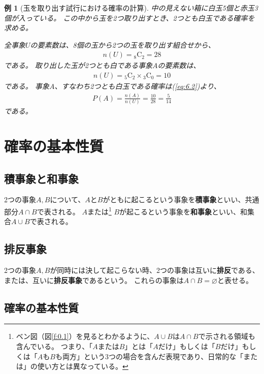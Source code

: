 \documentclass[luatexja,fontsize=12pt]{jlreq}\usepackage{ifthen}\newcounter{enlarge}\setcounter{enlarge}{1}
\newtheorem{eg}{例}
\begin{document}
\begin{eg}[玉を取り出す試行における確率の計算]
中の見えない箱に白玉5個と赤玉3個が入っている。
この中から玉を2つ取り出すとき、2つとも白玉である確率を求める。

全事象$U$の要素数は、8個の玉から2つの玉を取り出す組合せから、
\begin{align} \label{eq:6.5}
n(U) = {}_8 \mathrm{C}_2 = 28 
\end{align}
である。
取り出した玉が2つとも白である事象$A$の要素数は、
\begin{align} \label{eq:6.6}
n(U) = {}_5 \mathrm{C}_2 \times {}_3 \mathrm{C}_0 = 10 
\end{align}
である。
事象$A$、すなわち2つとも白玉である確率は(\ref{eq:6.2})より、
\begin{align} \label{eq:6.7}
P(A) = \frac{n(A)}{n(U)} = \frac{10}{28} = \frac{5}{14}
\end{align}
である。
\end{eg}

\section{確率の基本性質}

\subsection{積事象と和事象}

2つの事象$A, B$について、$A$と$B$がともに起こるという事象を\textbf{積事象}といい、共通部分$A \cap B$で表される。
$A$または\footnote{%
ベン図（図\ref{f:0.1}）を見るとわかるように、$A \cup B$は$A \cap B$で示される領域も含んでいる。
つまり、「$A$または$B$」とは「$A$だけ」もしくは「$B$だけ」もしくは「$A$も$B$も両方」という3つの場合を含んだ表現であり、日常的な「または」の使い方とは異なっている。
}
$B$が起こるという事象を\textbf{和事象}といい、和集合$A \cup B$で表される。

\subsection{排反事象}

2つの事象$A, B$が同時には決して起こらない時、2つの事象は互いに\textbf{排反}である、または、互いに\textbf{排反事象}であるという。
これらの事象は$A \cap B = \varnothing$と表せる。

\subsection{確率の基本性質}
\end{document}
